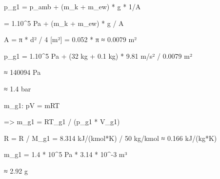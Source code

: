 p_g1 = p_amb + (m_k + m_ew) * g * 1/A

= 1.10^5 Pa + (m_k + m_ew) * g / A

A = π * d² / 4 [m²] = 0.052 * π ≈ 0.0079 m²

p_g1 = 1.10^5 Pa + (32 kg + 0.1 kg) * 9.81 m/s² / 0.0079 m²

≈ 140094 Pa

≈ 1.4 bar

m_g1: pV = mRT

=> m_g1 = RT_g1 / (p_g1 * V_g1)

R = R / M_g1 = 8.314 kJ/(kmol*K) / 50 kg/kmol ≈ 0.166 kJ/(kg*K)

m_g1 = 1.4 * 10^5 Pa * 3.14 * 10^-3 m³

≈ 2.92 g